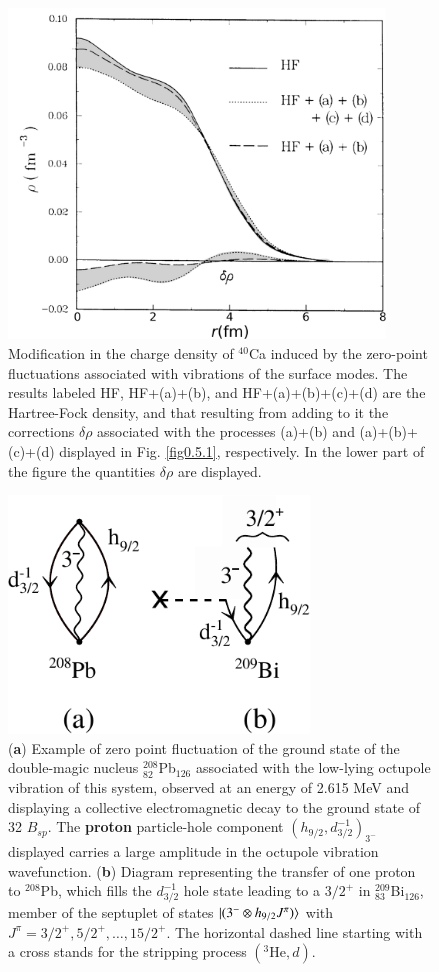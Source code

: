 \begin{figure}
	\centerline {
		\includegraphics*[width=10cm, angle=0.]{introduccion/figs/fig0_8_2}
	}
	\caption{Modification in the charge density of $^{40}$Ca induced by the zero-point fluctuations associated with vibrations of the surface modes. The results labeled HF, HF+(a)+(b), and HF+(a)+(b)+(c)+(d) are the Hartree-Fock density, and that resulting from adding to it the corrections $\delta\rho$ associated with the processes (a)+(b) and (a)+(b)+(c)+(d) displayed in Fig. \ref{fig0.5.1}, respectively. In the lower part of the figure the  quantities $\delta\rho$ are displayed.}
	\label{fig0.5.2}
\end{figure}
\begin{figure}
	\centerline {
		\includegraphics*[width=8cm, angle=0.]{introduccion/figs/fig0_5_3}
	}
	\caption{(\textbf{a}) Example of zero point fluctuation of the ground state of the double-magic nucleus $^{208}_{82}$Pb$_{126}$ associated with the low-lying octupole vibration of this system, observed at an energy of 2.615 MeV and displaying a collective electromagnetic decay to the ground state of 32 $B_{sp}$. The \textbf{proton} particle-hole component $(h_{9/2},d^{-1}_{3/2})_{3^-}$ displayed carries a large amplitude in the octupole vibration wavefunction. (\textbf{b}) Diagram representing the transfer of one proton to $^{208}$Pb, which fills the $d_{3/2}^{-1}$ hole state leading to a $3/2^+$ in $^{209}_{83}$Bi$_{126}$, member of the septuplet of states $|{(3^-\otimes h_{9/2}J^\pi)} \rangle$ with $J^\pi=3/2^+,5/2^+,\dots,15/2^+$. The horizontal dashed line starting with a cross stands for the stripping process $(^3\text{He},d)$.}
	\label{fig0.5.3}
\end{figure}
